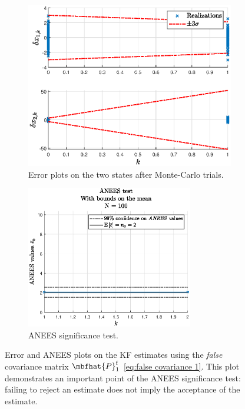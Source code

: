 \documentclass{simple-article}
\begin{document}
\begin{figure}[H]
  \centering
  \begin{subfigure}{0.45\textwidth}
    \includegraphics[width=\textwidth]{figs/error_plots_N100_falseCovariance_scatter.eps}
    \caption{Error plots on the two states after Monte-Carlo trials.}
    \label{fig:error_plots_N100_falseCovariance_scatter}
  \end{subfigure}
  \begin{subfigure}{0.45\textwidth}
    \includegraphics[width=0.8\textwidth]{figs/anees_N100_falseCovariance.eps}    
    \caption{ANEES significance test.}
    \label{fig:anees_N100_falseCovariance}
  \end{subfigure}
  \caption{Error and ANEES plots on the KF estimates using the \emph{false} covariance matrix $\mbfhat{P}_{1}^{\mathrm{f}}$ \eqref{eq:false covariance 1}. This plot demonstrates an important point of the ANEES significance test: failing to reject an estimate does not imply the acceptance of the estimate.}
  \label{fig:false covariance plots 1}
\end{figure}
\end{document}
